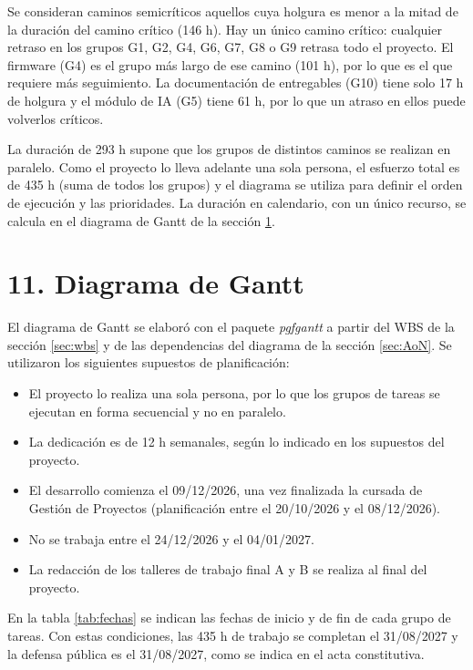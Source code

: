 \documentclass[
11pt, %
]{charter}
\begin{document}
Se consideran caminos semicríticos aquellos cuya holgura es menor a la mitad de la duración del camino crítico (146 h). Hay un único camino crítico: cualquier retraso en los grupos G1, G2, G4, G6, G7, G8 o G9 retrasa todo el proyecto. El firmware (G4) es el grupo más largo de ese camino (101 h), por lo que es el que requiere más seguimiento. La documentación de entregables (G10) tiene solo 17 h de holgura y el módulo de IA (G5) tiene 61 h, por lo que un atraso en ellos puede volverlos críticos.

La duración de 293 h supone que los grupos de distintos caminos se realizan en paralelo. Como el proyecto lo lleva adelante una sola persona, el esfuerzo total es de 435 h (suma de todos los grupos) y el diagrama se utiliza para definir el orden de ejecución y las prioridades. La duración en calendario, con un único recurso, se calcula en el diagrama de Gantt de la sección \ref{sec:gantt}.


\section{11. Diagrama de Gantt}
\label{sec:gantt}

El diagrama de Gantt se elaboró con el paquete \textit{pgfgantt} a partir del WBS de la sección \ref{sec:wbs} y de las dependencias del diagrama de la sección \ref{sec:AoN}. Se utilizaron los siguientes supuestos de planificación:

\begin{itemize}
	\item El proyecto lo realiza una sola persona, por lo que los grupos de tareas se ejecutan en forma secuencial y no en paralelo.
	\item La dedicación es de 12 h semanales, según lo indicado en los supuestos del proyecto.
	\item El desarrollo comienza el 09/12/2026, una vez finalizada la cursada de Gestión de Proyectos (planificación entre el 20/10/2026 y el 08/12/2026).
	\item No se trabaja entre el 24/12/2026 y el 04/01/2027.
	\item La redacción de los talleres de trabajo final A y B se realiza al final del proyecto.
\end{itemize}

En la tabla \ref{tab:fechas} se indican las fechas de inicio y de fin de cada grupo de tareas. Con estas condiciones, las 435 h de trabajo se completan el 31/08/2027 y la defensa pública es el 31/08/2027, como se indica en el acta constitutiva.
\end{document}
